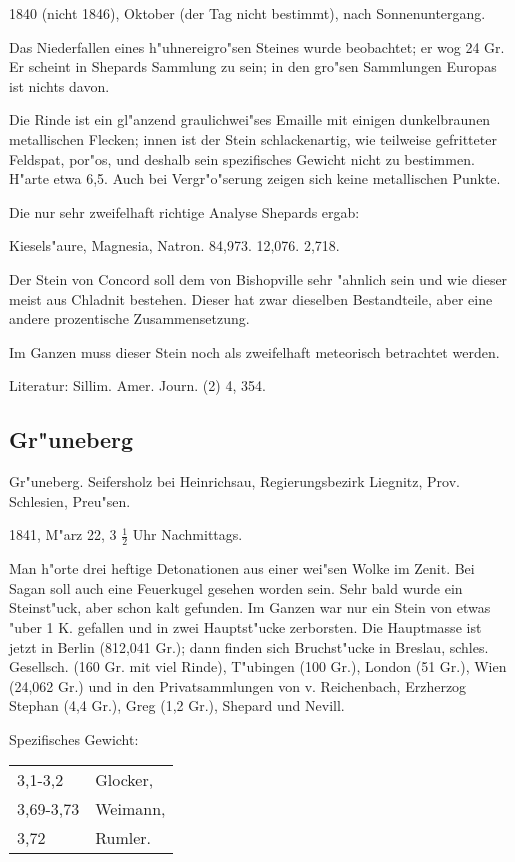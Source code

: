 \documentclass[a4paper, 11pt, oneside]{article}
\begin{document}
1840 (nicht 1846), Oktober (der Tag nicht bestimmt), nach Sonnenuntergang.

Das Niederfallen eines h"uhnereigro"sen Steines wurde beobachtet; er wog 24 Gr. Er scheint in Shepards Sammlung zu sein; in den gro"sen Sammlungen Europas ist nichts davon.

Die Rinde ist ein gl"anzend graulichwei"ses Emaille mit einigen dunkelbraunen metallischen Flecken; innen ist der Stein schlackenartig, wie teilweise gefritteter Feldspat, por"os, und deshalb sein spezifisches Gewicht nicht zu bestimmen. H"arte etwa 6,5. Auch bei Vergr"o"serung zeigen sich keine metallischen Punkte.

Die nur sehr zweifelhaft richtige Analyse Shepards ergab:

Kiesels"aure, Magnesia, Natron.  
84,973. 12,076. 2,718.

Der Stein von Concord soll dem von Bishopville sehr "ahnlich sein und wie dieser meist aus Chladnit bestehen. Dieser hat zwar dieselben Bestandteile, aber eine andere prozentische Zusammensetzung.

Im Ganzen muss dieser Stein noch als zweifelhaft meteorisch betrachtet werden.

Literatur: Sillim. Amer. Journ. (2) 4, 354.

\subsection{Gr"uneberg}

Gr"uneberg. Seifersholz bei Heinrichsau, Regierungsbezirk Liegnitz, Prov. Schlesien, Preu"sen.

1841, M"arz 22, 3 $\frac{1}{2}$ Uhr Nachmittags.

Man h"orte drei heftige Detonationen aus einer wei"sen Wolke im Zenit. Bei Sagan soll auch eine Feuerkugel gesehen worden sein. Sehr bald wurde ein Steinst"uck, aber schon kalt gefunden. Im Ganzen war nur ein Stein von etwas "uber 1 K. gefallen und in zwei Hauptst"ucke zerborsten. Die Hauptmasse ist jetzt in Berlin (812,041 Gr.); dann finden sich Bruchst"ucke in Breslau, schles. Gesellsch. (160 Gr. mit viel Rinde), T"ubingen (100 Gr.), London (51 Gr.), Wien (24,062 Gr.) und in den Privatsammlungen von v. Reichenbach, Erzherzog Stephan (4,4 Gr.), Greg (1,2 Gr.), Shepard und Nevill.

Spezifisches Gewicht:
\begin{table}[!ht]
    \centering
    \begin{tabular}{l l}
        3,1-3,2 & Glocker,\\
        3,69-3,73 & Weimann,\\
        3,72 & Rumler.
    \end{tabular}
\end{table}
\end{document}
